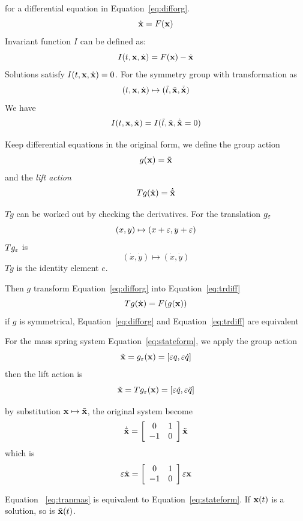 for a differential equation in Equation~\ref{eq:difforg}.
\begin{equation}
\label{eq:difforg}
\dot{\mathbf{x}}=F(\mathbf{x})
\end{equation}
Invariant function $I$ can be defined as:
\[
I(t,\mathbf{x},\dot{\mathbf{x}})=F(\mathbf{x})-\dot{\mathbf{x}}
\]
Solutions satisfy $I(t,\mathbf{x},\dot{\mathbf{x}})=0$.
For the symmetry group with transformation as 
\[
(t,\mathbf{x},\dot{\mathbf{x}}) \mapsto (\tilde{t},\tilde{\mathbf{x}},\tilde{\dot{\mathbf{x}}})
\]
We have
\[
I(t,\mathbf{x},\dot{\mathbf{x}})=I(\tilde{t},\tilde{\mathbf{x}},\dot{\tilde{\mathbf{x}}}=0)
\]

Keep differential equations in the original form, we define the group action 
\[
g(\mathbf{x})=\tilde{\mathbf{x}}
\]
and the \emph{lift action} 
\[
Tg(\dot{\mathbf{x}})=\dot{\tilde{\mathbf{x}}}
\]

$Tg$ can be worked out by checking the derivatives.
For the translation $g_{\varepsilon}$ 
\[
(x,y)\mapsto (x+\varepsilon,y+\varepsilon)
\]
$Tg_{\varepsilon}$ is
\[
(\dot{x},\dot{y}) \mapsto (\dot{x},\dot{y})
\]
$Tg$ is the identity element $e$.


Then $g$ transform Equation~\ref{eq:difforg} into Equation~\ref{eq:trdiff}
\begin{equation}
\label{eq:trdiff}
Tg(\dot{\mathbf{x}})=F(g(\mathbf{x}))
\end{equation}
if $g$ is symmetrical, Equation~\ref{eq:difforg} and Equation~\ref{eq:trdiff} are equivalent







 	
For the mass spring system Equation~\ref{eq:stateform}, we apply the group action 
\[
\tilde{\mathbf{x}}=g_{\varepsilon}(\mathbf{x})=[\varepsilon q, \varepsilon \dot{q} ]
\]
then the lift action is
\[
\tilde{\mathbf{x}}=Tg_{\varepsilon}(\mathbf{x})=[\varepsilon \dot{q}, \varepsilon \ddot{q}]
\]



by substitution $\mathbf{x} \mapsto \tilde{\mathbf{x}}$, the original system become
\[ 
\dot{\tilde{\mathbf{x}}}=
\left[ 
\begin{array}{cc}
0 &1\\
-1 &0 
\end{array}
\right]\tilde{\mathbf{x}}
\]
which is 
\begin{equation}
\label{eq:tranmas} 
\varepsilon \dot{\mathbf{x}}=
\left[ 
\begin{array}{cc}
0 &1\\
-1 &0 
\end{array}
\right]\varepsilon \mathbf{x}
\end{equation}

Equation ~\ref{eq:tranmas} is equivalent to  Equation~\ref{eq:stateform}.
If $\mathbf{x}(t)$ is a solution, so is $\tilde{\mathbf{x}}(t)$.

